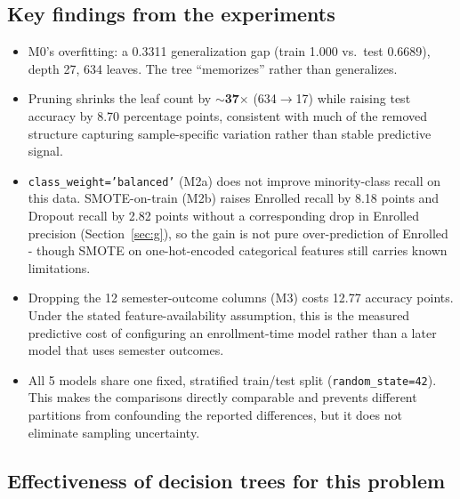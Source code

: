\subsection{Key findings from the experiments}

\begin{itemize}
  \item M0's overfitting: a 0.3311 generalization gap (train 1.000 vs.\
    test 0.6689), depth 27, 634 leaves. The tree ``memorizes'' rather
    than generalizes.
  \item Pruning shrinks the leaf count by \textbf{$\sim$37$\times$}
    (634$\to$17) while raising test accuracy by 8.70 percentage points,
    consistent with much of the removed structure capturing sample-specific
    variation rather than stable predictive signal.
  \item \texttt{class\_weight='balanced'} (M2a) does not improve
    minority-class recall on this data. SMOTE-on-train (M2b) raises
    Enrolled recall by 8.18 points and Dropout recall by 2.82 points
    without a corresponding drop in Enrolled precision
    (Section~\ref{sec:g}), so the gain is not pure over-prediction of
    Enrolled - though SMOTE on one-hot-encoded categorical features
    still carries known limitations.
  \item Dropping the 12 semester-outcome columns (M3) costs 12.77
    accuracy points. Under the stated feature-availability assumption,
    this is the measured predictive cost of configuring an enrollment-time
    model rather than a later model that uses semester outcomes.
  \item All 5 models share one fixed, stratified train/test split
    (\texttt{random\_state=42}). This makes the comparisons directly
    comparable and prevents different partitions from confounding the
    reported differences, but it does not eliminate sampling uncertainty.
\end{itemize}

\subsection{Effectiveness of decision trees for this problem}

